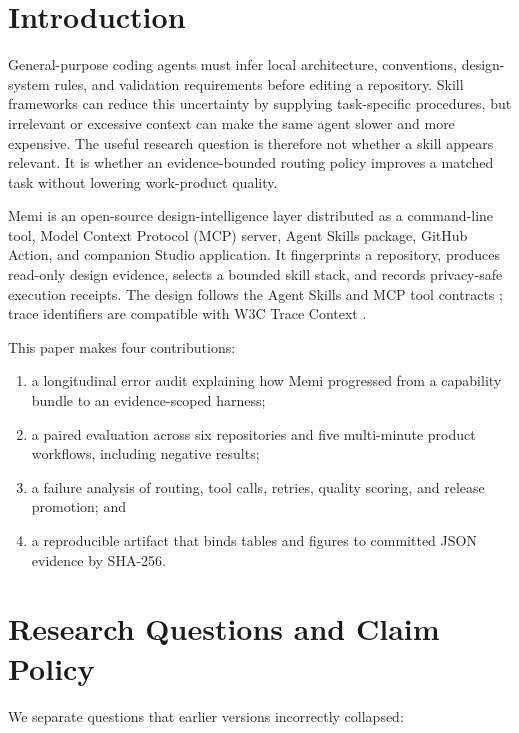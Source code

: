 \documentclass[10pt,twocolumn]{article}
\begin{document}
\section{Introduction}

General-purpose coding agents must infer local architecture, conventions,
design-system rules, and validation requirements before editing a repository.
Skill frameworks can reduce this uncertainty by supplying task-specific
procedures, but irrelevant or excessive context can make the same agent slower
and more expensive. The useful research question is therefore not whether a
skill appears relevant. It is whether an evidence-bounded routing policy
improves a matched task without lowering work-product quality.

Memi is an open-source design-intelligence layer distributed as a command-line
tool, Model Context Protocol (MCP) server, Agent Skills package, GitHub Action,
and companion Studio application. It fingerprints a repository, produces
read-only design evidence, selects a bounded skill stack, and records
privacy-safe execution receipts. The design follows the Agent Skills and MCP
tool contracts \cite{agentskills2026spec,mcp2025tools}; trace identifiers are
compatible with W3C Trace Context \cite{w3c2021trace}.

This paper makes four contributions:

\begin{enumerate}
  \item a longitudinal error audit explaining how Memi progressed from a
  capability bundle to an evidence-scoped harness;
  \item a paired evaluation across six repositories and five multi-minute
  product workflows, including negative results;
  \item a failure analysis of routing, tool calls, retries, quality scoring,
  and release promotion; and
  \item a reproducible artifact that binds tables and figures to committed
  JSON evidence by SHA-256.
\end{enumerate}

\section{Research Questions and Claim Policy}

We separate questions that earlier versions incorrectly collapsed:
\end{document}
